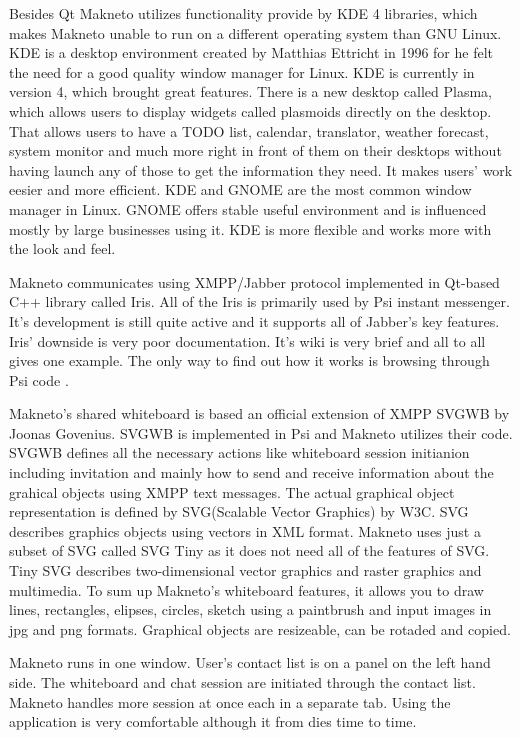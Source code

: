 Besides Qt Makneto utilizes functionality provide by KDE 4\cite{KDE} libraries, which makes Makneto unable to run on a different operating system than GNU Linux. KDE is a desktop environment created by Matthias Ettricht in 1996 for he felt the need for a good quality window manager for Linux. KDE is currently in version 4, which brought great features. There is a new desktop called Plasma, which allows users to display widgets called plasmoids directly on the desktop. That allows users to have a TODO list, calendar, translator, weather forecast, system monitor and much more right in front of them on their desktops without having launch any of those to get the information they need. It makes users' work eesier and more efficient. KDE and GNOME are the most common window manager in Linux. GNOME offers stable useful environment and is influenced mostly by large businesses using it. KDE is more flexible and works more with the look and feel.

Makneto communicates using XMPP/Jabber protocol implemented in Qt-based C++ library called Iris. All of the Iris is primarily used by Psi instant messenger. It's development is still quite active and it supports all of Jabber's key features. Iris' downside is very poor documentation. It's wiki is very brief and all to all gives one example. The only way to find out how it works is browsing through Psi code \cite{irisWiki}.

Makneto's shared whiteboard is based an official extension of XMPP SVGWB by Joonas Govenius\cite{SVGWB}. SVGWB is implemented in Psi and Makneto utilizes their code. SVGWB defines all the necessary actions like whiteboard session initianion including invitation and mainly how to send and receive information about the grahical objects using XMPP text messages. The actual graphical object representation is defined by SVG\cite{SVG}(Scalable Vector Graphics) by W3C. SVG describes graphics objects using vectors in XML format. Makneto uses just a subset of SVG called SVG Tiny\cite{SVGtiny} as it does not need all of the features of SVG. Tiny SVG describes two-dimensional vector graphics and raster graphics and multimedia. To sum up Makneto's whiteboard features, it allows you to draw lines, rectangles, elipses, circles, sketch using a paintbrush and input images in jpg and png formats. Graphical objects are resizeable, can be rotaded and copied.  


Makneto runs in one window. User's contact list is on a panel on the left hand side. The whiteboard and chat session are initiated through the contact list. Makneto handles more session at once each in a separate tab. Using the application is very comfortable although it from dies time to time.

